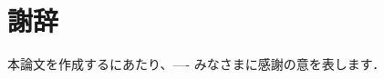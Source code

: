 \documentclass[11pt,a4j]{jarticle}
\begin{document}
\section*{謝辞} %
本論文を作成するにあたり、---- みなさまに感謝の意を表します．


\cite{keg}
\cite{ck3}
\end{document}
